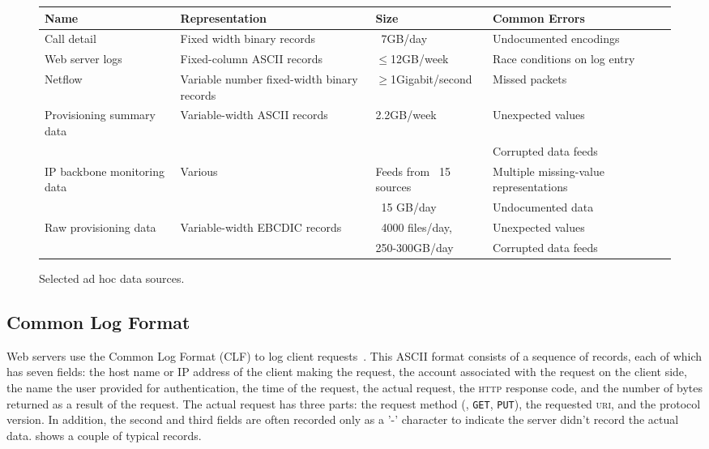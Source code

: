 \documentclass{sig-alternate}
\begin{document}
\begin{figure*}
\begin{center}
\begin{tabular}{|l|l|l|l|l|}
\hline
Name                    &  Representation                               &    Size               & Common Errors \\ \hline
Call detail             &  Fixed width binary   records         & ~7GB/day         &  Undocumented encodings\\  \hline 
Web server logs  &  Fixed-column ASCII  records     & $\leq$12GB/week & Race conditions on log entry\\ \hline
Netflow                  & Variable number fixed-width binary records & $\ge$1Gigabit/second & Missed packets\\ \hline
Provisioning summary data & Variable-width ASCII records & 2.2GB/week & Unexpected values \\ 
                                &                                                                        &                         & Corrupted data feeds \\ \hline
IP backbone monitoring data  & Various & Feeds from ~15 sources      & Multiple missing-value representations \\ \hline
                               &                                                                        & ~15 GB/day   & Undocumented data \\ \hline
Raw provisioning data  & Variable-width EBCDIC records  & ~4000 files/day,    &  Unexpected values\\ 
                                &                                                                        & 250-300GB/day    & Corrupted data feeds \\ \hline

\end{tabular}
\label{figure:data-sources}
\caption{Selected ad hoc data sources.}
\end{center}
\end{figure*}

\subsection{Common Log Format}
Web servers use the Common Log Format (CLF) to log client requests~\cite{wpp}.  This ASCII format consists of a sequence of records, each of which has seven fields: the host name or IP address of the client making the request, the account associated with the request on the client side, the name the user provided for authentication, the time of the request, the actual request, the \textsc{http} response code, and the number of bytes returned as a result of the request.  The actual request has three parts: the request method (\eg, \texttt{GET}, \texttt{PUT}), the requested \textsc{uri}, and the protocol version.  
In addition, the second and third fields are often recorded only as a '-' character to indicate the server didn't record the actual data.    shows a couple of typical records.
\end{document}
